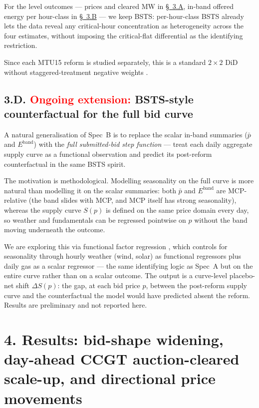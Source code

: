 \documentclass[11pt]{article}
\begin{document}
For the level outcomes --- prices and cleared MW in \hyperref[sec:bsts]{\S~3.A}, in-band offered energy per hour-class in \hyperref[sec:smart_desc]{\S~3.B} --- we keep BSTS: per-hour-class BSTS already lets the data reveal any critical-hour concentration as heterogeneity across the four estimates, without imposing the critical-flat differential as the identifying restriction.

Since each MTU15 reform is studied separately, this is a standard $2\times 2$ DiD without staggered-treatment negative weights \citep[ch.~3]{de_chaisemartin_2026}.

\subsection*{3.D. \textcolor{red}{Ongoing extension:} BSTS-style counterfactual for the full bid curve}
\label{sec:fbr}
A natural generalisation of Spec~B is to replace the scalar in-band summaries ($\bar p$ and $E^{\text{band}}$) with the \emph{full submitted-bid step function} --- treat each daily aggregate supply curve as a functional observation and predict its post-reform counterfactual in the same BSTS spirit.

The motivation is methodological. Modelling seasonality on the full curve is more natural than modelling it on the scalar summaries: both $\bar p$ and $E^{\text{band}}$ are MCP-relative (the band slides with MCP, and MCP itself has strong seasonality), whereas the supply curve $S(p)$ is defined on the same price domain every day, so weather and fundamentals can be regressed pointwise on $p$ without the band moving underneath the outcome.

We are exploring this via functional factor regression \citep{otto_winter_2025}, which controls for seasonality through hourly weather (wind, solar) as functional regressors plus daily gas as a scalar regressor --- the same identifying logic as Spec~A but on the entire curve rather than on a scalar outcome. The output is a curve-level placebo-net shift $\Delta S(p)$: the gap, at each bid price $p$, between the post-reform supply curve and the counterfactual the model would have predicted absent the reform. Results are preliminary and not reported here.

\vspace{10pt}

\section*{4. Results: bid-shape widening, day-ahead CCGT auction-cleared scale-up, and directional price movements}
\label{sec:results}
\end{document}
